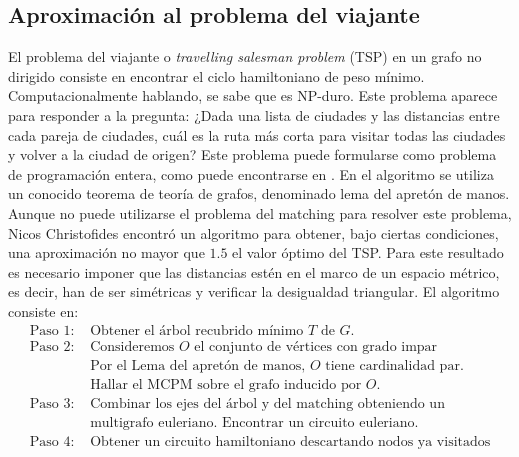 \documentclass[twoside,a4paper,openright,12pt]{book}
\begin{document}
\subsection{Aproximación al problema del viajante}
El problema del viajante o \textit{travelling salesman problem} (TSP) en un grafo no dirigido consiste en encontrar el ciclo hamiltoniano de peso mínimo. Computacionalmente hablando, se sabe que es NP-duro. Este problema aparece para responder a la pregunta: ¿Dada una lista de ciudades y las distancias entre cada pareja de ciudades, cuál es la ruta más corta para visitar todas las ciudades y volver a la ciudad de origen? Este problema puede formularse como problema de programación entera, como puede encontrarse en \cite{papa}. 
En el algoritmo se utiliza un conocido teorema de teoría de grafos, denominado lema del apretón de manos.
Aunque no puede utilizarse el problema del matching para resolver este problema, Nicos Christofides encontró un algoritmo \cite{nico} para obtener, bajo ciertas condiciones, una aproximación no mayor que $1.5$ el valor óptimo del TSP. Para este resultado es necesario imponer que las distancias estén en el marco de un espacio métrico, es decir, han de ser simétricas y verificar la desigualdad triangular. El algoritmo consiste en:
\begin{align*}
\text{Paso 1: }&\text{Obtener el árbol recubrido mínimo $T$ de $G$.}\\
\text{Paso 2: }&\text{Consideremos $O$ el conjunto de vértices con grado impar}\\
&\text{Por el Lema del apretón de manos, $O$ tiene cardinalidad par.}\\
&\text{Hallar el MCPM sobre el grafo inducido por $O$.}\\
\text{Paso 3: }& \text{Combinar los ejes del árbol y del matching obteniendo un}\\
&\text{multigrafo euleriano. Encontrar un circuito euleriano.}\\
\text{Paso 4: }&\text{Obtener un circuito hamiltoniano descartando nodos ya visitados}
\end{align*} 
\end{document}

